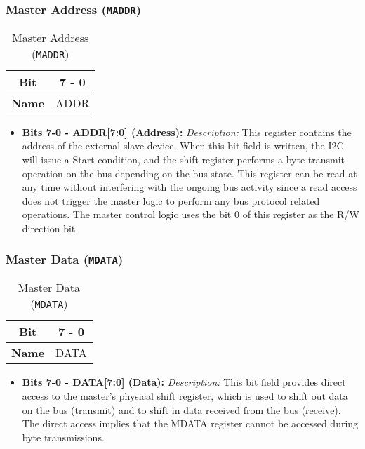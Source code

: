   \subsubsection{Master Address (\texttt{MADDR})}
  \label{sec:maddr}

  \begin{table}[H]
    \centering
    \caption{Master Address (\texttt{MADDR})}
    \begin{tabular}{@{}cc@{}}
        \toprule
        \textbf{Bit} & 7 - 0 \\ \midrule
        \textbf{Name} & ADDR \\ \bottomrule
    \end{tabular}
    \label{tab:maddr}
  \end{table}

  \begin{itemize}
    
    \item \textbf{Bits 7-0 - ADDR[7:0] (Address):} 
    \textit{Description:} This register contains the address of the external slave device. When this bit field is written, the I2C will issue a Start
    condition, and the shift register performs a byte transmit operation on the bus depending on the bus state.
    This register can be read at any time without interfering with the ongoing bus activity since a read access does not
    trigger the master logic to perform any bus protocol related operations.
    The master control logic uses the bit 0 of this register as the R/W direction bit
  \end{itemize}

    \subsubsection{Master Data (\texttt{MDATA})}
    \label{sec:mdata}
  
    \begin{table}[H]
      \centering
      \caption{Master Data (\texttt{MDATA})}
      \begin{tabular}{@{}cc@{}}
          \toprule
          \textbf{Bit} & 7 - 0 \\ \midrule
          \textbf{Name} & DATA \\ \bottomrule
      \end{tabular}
      \label{tab:mdata}
    \end{table}
  
    \begin{itemize}
      
      \item \textbf{Bits 7-0 - DATA[7:0] (Data):} 
      \textit{Description:} This bit field provides direct access to the master’s physical shift register, which is used to shift out data on the bus
      (transmit) and to shift in data received from the bus (receive). The direct access implies that the MDATA register
      cannot be accessed during byte transmissions.
    \end{itemize}

